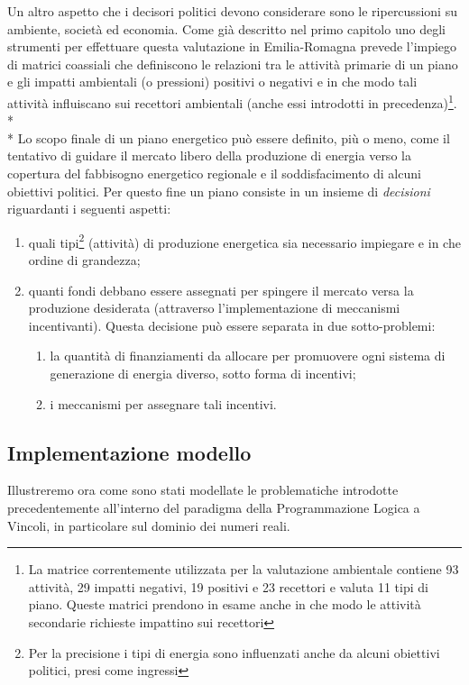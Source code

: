 Un altro aspetto che i decisori politici devono considerare sono le ripercussioni su ambiente, società ed economia. Come già descritto nel primo capitolo uno degli strumenti per effettuare questa valutazione in Emilia-Romagna prevede l'impiego di matrici coassiali che definiscono le relazioni tra le attività primarie di un piano e gli impatti ambientali (o pressioni) positivi o negativi e in che modo tali attività influiscano sui recettori ambientali (anche essi introdotti in precedenza)\footnote{La matrice correntemente utilizzata per la valutazione ambientale contiene 93 attività, 29 impatti negativi, 19 positivi e 23 recettori e valuta 11 tipi di piano. Queste matrici prendono in esame anche in che modo le attività secondarie richieste impattino sui recettori}. 
\\*\\*
Lo scopo finale di un piano energetico può essere definito, più o meno, come il tentativo di guidare il mercato libero della produzione di energia verso la copertura del fabbisogno energetico regionale e il soddisfacimento di alcuni obiettivi politici. Per questo fine un piano consiste in un insieme di \emph{decisioni} riguardanti i seguenti aspetti:
\begin{enumerate}
\item quali tipi\footnote{Per la precisione i tipi di energia sono influenzati anche da alcuni obiettivi politici, presi come ingressi} (attività) di produzione energetica sia necessario impiegare e in che ordine di grandezza; 
\item quanti fondi debbano essere assegnati per spingere il mercato versa la produzione desiderata (attraverso l'implementazione di meccanismi incentivanti). Questa decisione può essere separata in due sotto-problemi:
	\begin{enumerate}
	\item la quantità di finanziamenti da allocare per promuovere ogni sistema di generazione di energia diverso, sotto forma di incentivi;
	\item i meccanismi per assegnare tali incentivi. 
	\end{enumerate}
\end{enumerate}

\subsection{Implementazione modello}
Illustreremo ora come sono stati modellate le problematiche introdotte precedentemente all'interno del paradigma della Programmazione Logica a Vincoli, in particolare sul dominio dei numeri reali.

